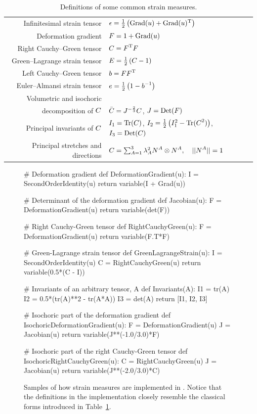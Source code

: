 \begin{table}
\begin{tabular}{rl}
Infinitesimal strain tensor & $\mbox{$\epsilon$} = \frac{1}{2}
  \left(\mathrm{Grad}(\mbox{$ u$}) + \mathrm{Grad}(\mbox{$ u$})^{\mathrm{T}}\right)$
\\
Deformation gradient &  $\mbox{$ F$} = {1} + \mathrm{Grad}(\mbox{$ u$})$
\\
Right Cauchy--Green tensor & $\mbox{$ C$} = \mbox{$ F$}^{\mathrm{T}} \mbox{$ F$}$
\\
Green--Lagrange strain tensor & $\mbox{$ E$} = \frac{1}{2} \left(\mbox{$ C$} -
  {1}\right)$
\\
Left Cauchy--Green tensor & $\mbox{$ b$} = \mbox{$ F$} \mbox{$ F$}^{\mathrm{T}}$
\\
Euler--Almansi strain tensor &  $\mbox{$ e$} = \frac{1}{2} \left({1} -
    \mbox{$ b$}^{-1}\right)$\\
Volumetric and isochoric\\ decomposition of $\mbox{$ C$}$ &  $\bar{\mbox{$ C$}} =
  J^{-\frac{2}{3}} \mbox{$ C$}$, \quad $J = \mathrm{Det}(\mbox{$ F$})$
\\
Principal invariants of $\mbox{$ C$}$ &  $I_{1} =
  \mathrm{Tr}(\mbox{$ C$})$, $I_{2} = \frac{1}{2}\left(I_{1}^{2} -
    \mathrm{Tr}(\mbox{$ C$}^{2})\right)$, $I_{3} = \mathrm{Det}(\mbox{$ C$})$
\\
Principal stretches and directions &  $\mbox{$ C$} = \sum_{A=1}^{3}
\lambda_{A}^{2} \mbox{$ N$}^{A} \otimes \mbox{$ N$}^{A}, \quad ||\mbox{$ N$}^{A}|| = 1$
\end{tabular}
\caption{Definitions of some common strain measures.}
\label{tab:narayanan:straindefs}
\end{table}

\begin{figure}
\begin{python}
# Deformation gradient
def DeformationGradient(u):
    I = SecondOrderIdentity(u)
    return variable(I + Grad(u))

# Determinant of the deformation gradient
def Jacobian(u):
    F = DeformationGradient(u)
    return variable(det(F))

# Right Cauchy-Green tensor
def RightCauchyGreen(u):
    F = DeformationGradient(u)
    return variable(F.T*F)

# Green-Lagrange strain tensor
def GreenLagrangeStrain(u):
    I = SecondOrderIdentity(u)
    C = RightCauchyGreen(u)
    return variable(0.5*(C - I))

# Invariants of an arbitrary tensor, A
def Invariants(A):
    I1 = tr(A)
    I2 = 0.5*(tr(A)**2 - tr(A*A))
    I3 = det(A)
    return [I1, I2, I3]

# Isochoric part of the deformation gradient
def IsochoricDeformationGradient(u):
    F = DeformationGradient(u)
    J = Jacobian(u)
    return variable(J**(-1.0/3.0)*F)

# Isochoric part of the right Cauchy-Green tensor
def IsochoricRightCauchyGreen(u):
    C = RightCauchyGreen(u)
    J = Jacobian(u)
    return variable(J**(-2.0/3.0)*C)
\end{python}
\caption{Samples of how strain measures are implemented in
  \twist. Notice that the definitions in the implementation closely
  resemble the classical forms introduced in
  Table~\ref{tab:narayanan:straindefs}.}
\label{code:narayanan:kinematics.py}
\end{figure}

